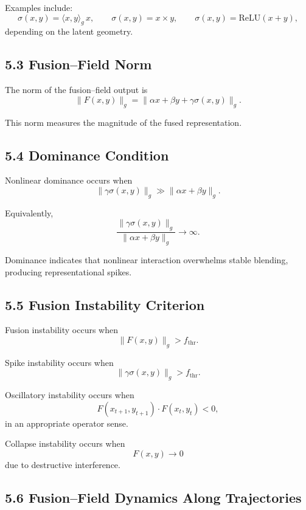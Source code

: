 Examples include:
\[
\sigma(x,y) = \langle x,y \rangle_g \, x,
\qquad
\sigma(x,y) = x \times y,
\qquad
\sigma(x,y) = \mathrm{ReLU}(x+y),
\]
depending on the latent geometry.

\subsection*{5.3 Fusion–Field Norm}

The norm of the fusion–field output is
\[
\|F(x,y)\|_g
= \|\alpha x + \beta y + \gamma \sigma(x,y)\|_g.
\]

This norm measures the magnitude of the fused representation.

\subsection*{5.4 Dominance Condition}

Nonlinear dominance occurs when
\[
\|\gamma \sigma(x,y)\|_g
\gg
\|\alpha x + \beta y\|_g.
\]

Equivalently,
\[
\frac{\|\gamma \sigma(x,y)\|_g}
     {\|\alpha x + \beta y\|_g}
\to \infty.
\]

Dominance indicates that nonlinear interaction overwhelms stable
blending, producing representational spikes.

\subsection*{5.5 Fusion Instability Criterion}

Fusion instability occurs when
\[
\|F(x,y)\|_g > f_{\mathrm{thr}}.
\]

Spike instability occurs when
\[
\|\gamma \sigma(x,y)\|_g > f_{\mathrm{thr}}.
\]

Oscillatory instability occurs when
\[
F(x_{t+1}, y_{t+1}) \cdot F(x_t, y_t) < 0,
\]
in an appropriate operator sense.

Collapse instability occurs when
\[
F(x,y) \to 0
\]
due to destructive interference.

\subsection*{5.6 Fusion–Field Dynamics Along Trajectories}

